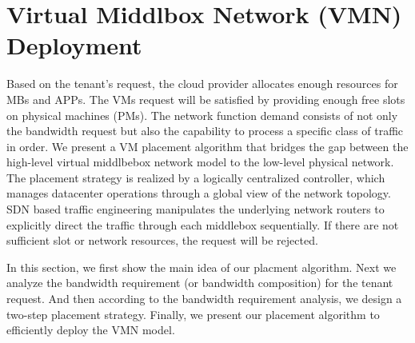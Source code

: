 \documentclass[review]{elsarticle}
\begin{document}

\section{Virtual Middlbox Network (VMN) Deployment}\label{sec:algorithm}
Based on the tenant's request, the cloud provider allocates enough resources for MBs and APPs. The VMs request will be satisfied by providing enough free slots on physical machines (PMs). The network function demand consists of not only the bandwidth request but also the capability to process a specific class of traffic in order. We present a VM placement algorithm that bridges the gap between the high-level virtual middlbebox network model to the low-level physical network. The placement strategy is realized by a logically centralized controller, which manages datacenter operations through a global view of the network topology. SDN based traffic engineering manipulates the underlying network routers to explicitly direct the traffic through each middlebox sequentially. If there are not sufficient slot or network resources, the request will be rejected. 

In this section, we first show the main idea of our placment algorithm. Next we analyze the bandwidth requirement (or bandwidth composition) for the tenant request. And then according to the bandwidth requirement analysis, we design a two-step placement strategy. Finally, we present our placement algorithm to efficiently deploy the VMN model. 
\end{document}
